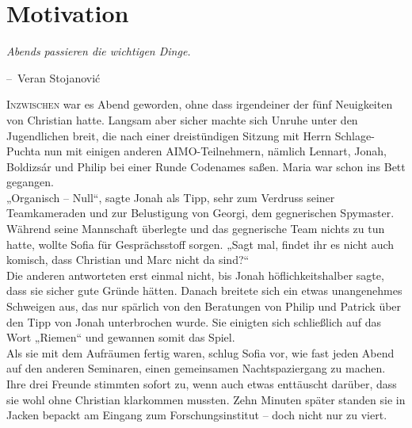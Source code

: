 \documentclass[oneside]{memoir}
\makeatletter
\newenvironment{chapquote}[2][2em]
  {\setlength{\@tempdima}{#1}%
   \def\chapquote@author{#2}%
   \parshape 1 \@tempdima \dimexpr\textwidth-2\@tempdima\relax%
   \itshape}
  {\par\normalfont\hfill--\ \chapquote@author\hspace*{\@tempdima}\par\bigskip}
\makeatother
\begin{document}
\chapter{Motivation} %
\begin{chapquote}{Veran Stojanović}
\glqq Abends passieren die wichtigen Dinge.\grqq
\end{chapquote}

\lettrine{I}{nzwischen} war es Abend geworden, ohne dass irgendeiner der fünf Neuigkeiten von Christian hatte. Langsam aber sicher machte sich Unruhe unter den Jugendlichen breit, die nach einer dreistündigen Sitzung mit Herrn Schlage-Puchta nun mit einigen anderen AIMO-Teilnehmern, nämlich Lennart, Jonah, Boldizsár und Philip bei einer Runde Codenames saßen. Maria war schon ins Bett gegangen. \\
„Organisch – Null“, sagte Jonah als Tipp, sehr zum Verdruss seiner Teamkameraden und zur Belustigung von Georgi, dem gegnerischen Spymaster. \\
Während seine Mannschaft überlegte und das gegnerische Team nichts zu tun hatte, wollte Sofia für Gesprächsstoff sorgen. „Sagt mal, findet ihr es nicht auch komisch, dass Christian und Marc nicht da sind?“ \\
Die anderen antworteten erst einmal nicht, bis Jonah höflichkeitshalber sagte, dass sie sicher gute Gründe hätten. Danach breitete sich ein etwas unangenehmes Schweigen aus, das nur spärlich von den Beratungen von Philip und Patrick über den Tipp von Jonah unterbrochen wurde. Sie einigten sich schließlich auf das Wort „Riemen“ und gewannen somit das Spiel. \\
Als sie mit dem Aufräumen fertig waren, schlug Sofia vor, wie fast jeden Abend auf den anderen Seminaren, einen gemeinsamen Nachtspaziergang zu machen. Ihre drei Freunde stimmten sofort zu, wenn auch etwas enttäuscht darüber, dass sie wohl ohne Christian klarkommen mussten. Zehn Minuten später standen sie in Jacken bepackt am Eingang zum Forschungsinstitut – doch nicht nur zu viert. \\
\end{document}
